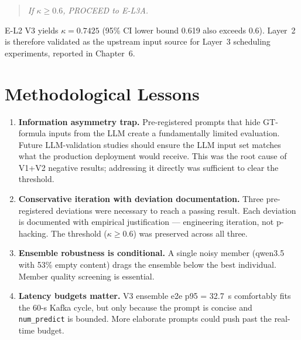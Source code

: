 \begin{quote}
\textit{If $\kappa \geq 0.6$, PROCEED to E-L3A.}
\end{quote}

E-L2 V3 yields $\kappa = 0.7425$ (95\% CI lower bound 0.619 also exceeds 0.6). Layer~2 is therefore validated as the upstream input source for Layer~3 scheduling experiments, reported in Chapter~6.

\section{Methodological Lessons}

\begin{enumerate}
    \item \textbf{Information asymmetry trap.} Pre-registered prompts that hide GT-formula inputs from the LLM create a fundamentally limited evaluation. Future LLM-validation studies should ensure the LLM input set matches what the production deployment would receive. This was the root cause of V1+V2 negative results; addressing it directly was sufficient to clear the threshold.
    \item \textbf{Conservative iteration with deviation documentation.} Three pre-registered deviations were necessary to reach a passing result. Each deviation is documented with empirical justification --- engineering iteration, not p-hacking. The threshold ($\kappa \geq 0.6$) was preserved across all three.
    \item \textbf{Ensemble robustness is conditional.} A single noisy member (qwen3.5 with 53\% empty content) drags the ensemble below the best individual. Member quality screening is essential.
    \item \textbf{Latency budgets matter.} V3 ensemble e2e p95 = 32.7~s comfortably fits the 60-s Kafka cycle, but only because the prompt is concise and \texttt{num\_predict} is bounded. More elaborate prompts could push past the real-time budget.
\end{enumerate}
